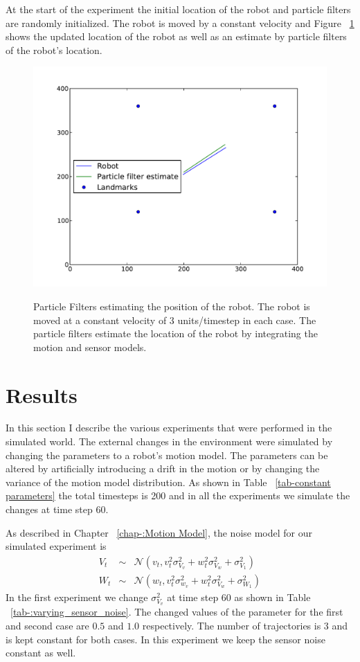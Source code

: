 \documentclass[12pt]{dalcsthesis}
\begin{document}
At the start of the experiment  the initial location of the robot and particle filters are randomly initialized. The robot is moved by a constant velocity and Figure ~\ref{fig-: movement simulation world} shows the updated location of the robot as well as an estimate by particle filters of the robot's location.
\begin{figure}
  \centering
     {\includegraphics[height = 3.0 in]{./plots/world_trajectory.pdf}}
  \caption{\label{fig-: movement simulation world}Particle Filters estimating the position of the robot. The robot is moved at a constant velocity of 3 units/timestep in each case. The particle filters estimate the location of the robot by integrating the motion and sensor models.}
\end{figure}

\section{Results}
In this section I describe the various experiments that were performed in the simulated world. The external changes in the environment were simulated by changing the parameters to a robot's motion model. The parameters can be altered by artificially introducing a drift in the motion or by changing the variance of the motion model distribution. As shown in Table ~\ref{tab-constant parameters} the total timesteps is 200 and in all the experiments we simulate the changes at time step 60. 

As described in Chapter ~\ref{chap-:Motion Model}, the noise model for our simulated experiment is 
\begin{eqnarray}
V_{t}&\sim&\mathcal{{N}}(v_{t},v_{t}^{2}\sigma_{V_{v}}^{2}+w_{t}^{2}\sigma_{V_{w}}^{2}+\sigma_{V_{1}}^{2}) \\
W_{t}&\sim&\mathcal{{N}}(w_{t},v_{t}^{2}\sigma_{w_{v}}^{2}+w_{t}^{2}\sigma_{V_{w}}^{2}+\sigma_{W_{1}}^{2})
\end{eqnarray}
In the first experiment we change $\sigma_{V_{v}}^2$ at time step 60 as shown in Table ~\ref{tab-:varying_sensor_noise}. The changed values of the parameter for the first and second case are $0.5$ and $1.0$ respectively. The number of trajectories is 3 and is kept constant for both cases. In this experiment we keep the sensor noise constant as well. 
\end{document}
